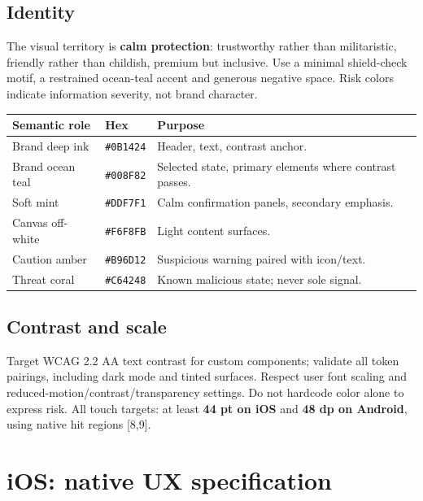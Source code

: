 \documentclass[10pt,a4paper]{article}
\begin{document}
\subsection{Identity}
The visual territory is \textbf{calm protection}: trustworthy rather than militaristic, friendly rather than childish, premium but inclusive. Use a minimal shield-check motif, a restrained ocean-teal accent and generous negative space. Risk colors indicate information severity, not brand character.
\begin{tabularx}{\linewidth}{@{}p{39mm}p{29mm}Y@{}}\toprule
\textbf{Semantic role} & \textbf{Hex} & \textbf{Purpose} \\ \midrule
Brand deep ink & \texttt{\#0B1424} & Header, text, contrast anchor. \\
Brand ocean teal & \texttt{\#008F82} & Selected state, primary elements where contrast passes. \\
Soft mint & \texttt{\#DDF7F1} & Calm confirmation panels, secondary emphasis. \\
Canvas off-white & \texttt{\#F6F8FB} & Light content surfaces. \\
Caution amber & \texttt{\#B96D12} & Suspicious warning paired with icon/text. \\
Threat coral & \texttt{\#C64248} & Known malicious state; never sole signal. \\
\bottomrule\end{tabularx}
\subsection{Contrast and scale}
Target WCAG 2.2 AA text contrast for custom components; validate all token pairings, including dark mode and tinted surfaces. Respect user font scaling and reduced-motion/contrast/transparency settings. Do not hardcode color alone to express risk. All touch targets: at least \textbf{44 pt on iOS} and \textbf{48 dp on Android}, using native hit regions [8,9].

\section{iOS: native UX specification}
\end{document}
